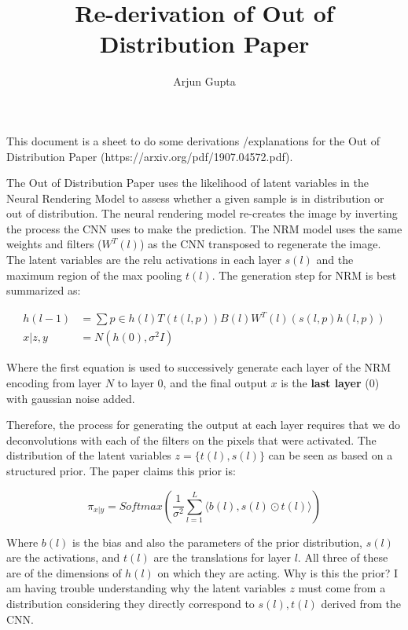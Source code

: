 \documentclass{report}
\title{Re-derivation of Out of Distribution Paper}
\author{Arjun Gupta}
\begin{document}
	\maketitle 
	
	This document is a sheet to do some derivations /explanations for the Out of Distribution Paper (https://arxiv.org/pdf/1907.04572.pdf).
	
	The Out of Distribution Paper uses the likelihood of latent variables in the Neural Rendering Model to assess whether a given sample is in distribution or out of distribution. The neural rendering model re-creates the image by inverting the process the CNN uses to make the prediction. The NRM model uses the same weights and filters ($W^T(l)$) as the CNN transposed to regenerate the image. The latent variables are the relu activations in each layer $s(l)$ and the maximum region of the max pooling $t(l)$. The generation step for NRM is best summarized as:
	
	\begin{equation}
		\begin{split}
		h(l-1) &= \sum{p \in h(l)} T(t(l, p))B(l)W^T(l)(s(l, p) h(l, p))\\
		x | z, y &= N(h(0), \sigma^2I)
		\end{split}
	\end{equation}
	
	Where the first equation is used to successively generate each layer of the NRM encoding from layer $N$ to layer $0$, and the final output $x$ is the \textbf{last layer} ($0$) with gaussian noise added.
	
	Therefore, the process for generating the output at each layer requires that we do deconvolutions with each of the filters on the pixels that were activated. The distribution of the latent variables $z = \{t(l), s(l)\}$ can be seen as based on a structured prior. The paper claims this prior is:
	
	\begin{equation}
		\pi_{x|y} = Softmax \left(\frac{1}{\sigma^2} \sum_{l=1}^{L} \langle b(l), s(l) \odot t(l) \rangle \right)
	\end{equation}

	Where $b(l)$ is the bias and also the parameters of the prior distribution, $s(l)$ are the activations, and $t(l)$ are the translations for layer $l$. All three of these are of the dimensions of $h(l)$ on which they are acting. Why is this the prior? I am having trouble understanding why the latent variables $z$ must come from a distribution considering they directly correspond to $s(l), t(l)$ derived from the CNN.
	
\end{document}
